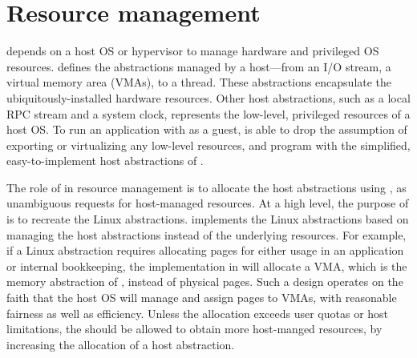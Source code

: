 \section{Resource management}
\label{sec:libos:resource}


\Thelibos{}
depends on a host OS or hypervisor to manage hardware and privileged OS resources.
\Thehostabi{}
defines the abstractions managed by a host---from an I/O stream, a virtual memory area (VMAs), to a thread. %
These abstractions encapsulate the ubiquitously-installed hardware resources.
Other host abstractions, %
such as a local RPC stream and a system clock,
represents the low-level, privileged resources of a host OS.
To run an application with \thelibos{} as a guest,
\graphene{} is able to drop the assumption of exporting or virtualizing %
any low-level resources,
and program \thelibos{} with the simplified, easy-to-implement host abstractions of \thehostabi{}.




The role of \thelibos{} in resource management
is to allocate the host abstractions using \thehostabi{},
as unambiguous requests %
for host-managed resources.
At a high level, the purpose of \thelibos{} is to recreate the Linux abstractions.
\Thelibos{} implements the Linux abstractions
based on managing the host abstractions instead of
the underlying resources.
For example, if a Linux abstraction requires allocating pages
for either usage in an application or
internal bookkeeping,
the implementation in
\thelibos{} will allocate a VMA, which is the memory abstraction of \thehostabi{}, instead of physical pages.
Such a \libos{} design operates on the faith that the host OS will manage and assign pages to VMAs, with reasonable fairness as well as efficiency.
Unless the allocation exceeds user quotas or host limitations,
the \libos{} should be allowed to obtain more host-manged resources,
by increasing the allocation of a host abstraction.



